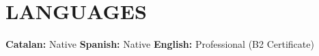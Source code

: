 \documentclass[letterpaper,11pt]{article}
\begin{document}
{%
\section{LANGUAGES}
    \textbf{Catalan:}{ Native}\hspace{22mm}
    \textbf{Spanish:}{ Native}\hspace{22mm}
    \textbf{English:}{ Professional (B2 Certificate)}

}
\vspace{5mm}



\end{document}
